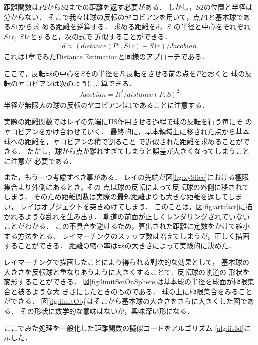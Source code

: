 距離関数は$P2$から$S2$までの距離を返す必要がある．
しかし，$S2$の位置と半径は分からない．
そこで我々は球の反転のヤコビアンを用いて，点$P1$と基本球である$S1$から求
める距離を逆算する．
求める距離を$d$，$S1$の半径と中心をそれぞれ$S1r,~S1c$とすると，次の式で
近似することができる．
\begin{align*}
 d \approx (distance(P1, S1c) - S1r) / Jacobian
\end{align*}
これは1章でみたDistance Estimationと同様のアプローチである．

ここで，反転球の中心を$S$その半径を$R$,反転をさせる前の点を$P$とおくと
球の反転のヤコビアンは次のように計算できる．
\begin{align*}
 Jacobian = R^2 / distance(P, S)^2 
\end{align*}
半径が無限大の球の反転のヤコビアンは1であることに注意する．

実際の距離関数ではレイの先端にIIS作用させる過程で球の反転を行う毎にそ
のヤコビアンをかけ合わせていく．
最終的に，基本領域上に移された点から基本球への距離を，ヤコビアンの積で割ること
で近似された距離を求めることができる．
ただし，球から点が離れすぎてしまうと誤差が大きくなってしまうことに注意が
必要である．

また，もう一つ考慮すべき事がある．
レイの先端が図\ref{fig:xySlice}における極限集合より外側にあるとき，その
点は球の反転によって反転球の外側に移されてしまう．
そのため距離関数は実際の最短距離よりも大きな距離を返してしまい，
レイはオブジェクトを突きぬけてしまう．
このことは，図\ref{fig:artifact}に描かれるような乱れを生み出す．
軌道の前面が正しくレンダリングされていないことがわかる．
この不具合を避けるため，算出された距離に定数をかけて縮小する方法をとる．
レイマーチングのステップ数は増えてしまうが，正しく描画することができる．
距離の縮小率は球の大きさによって実験的に決めた．

レイマーチングで描画したことにより得られる副次的な効果として，
基本球の大きさを反転球と重なりあうように大きくすることで，反転球の軌道の
形状を変形することができる．
図\ref{fig:limitSetOnSphere}は基本球の半径を球面が極限集合と被るような大
きさにしたときのものである．
球の上に極限集合をみることができる．
図\ref{fig:limitObj}はそこから基本球の大きさをさらに大きくした図である．
その形状に数学的な意味はないが，興味深い形になる．

ここでみた処理を一般化した距離関数の擬似コードをアルゴリズム
\ref{alg:iis3d}に示した．

